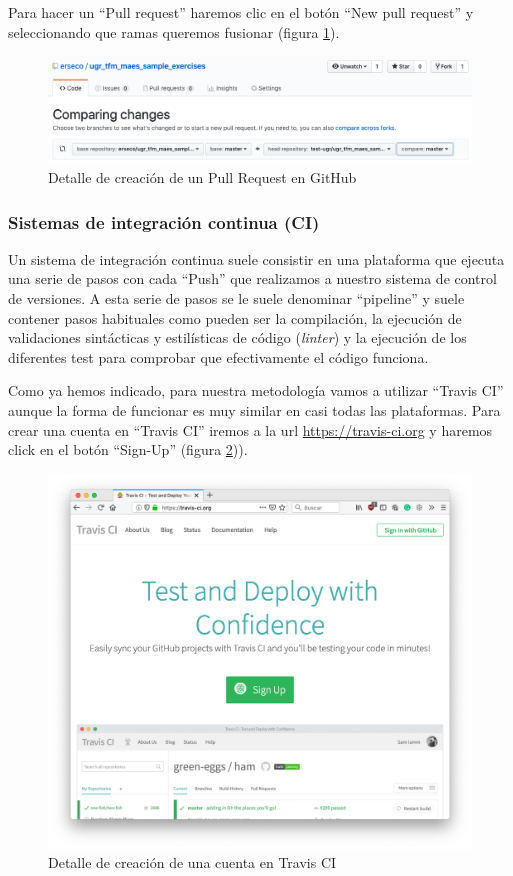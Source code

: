Para hacer un ``Pull request'' haremos clic en el botón ``New pull request'' y seleccionando que ramas queremos fusionar (figura \ref{fig:git_pr}).

\begin{figure}[H]
\centering
\includegraphics[width=1.0\textwidth]{../images/git_pr}
\caption{Detalle de creación de un Pull Request en GitHub}
\label{fig:git_pr}
\end{figure}


\subsubsection{Sistemas de integración continua (CI)}

Un sistema de integración continua suele consistir en una plataforma que ejecuta una serie de pasos con cada ``Push'' que realizamos a nuestro sistema de control de versiones. A esta serie de pasos se le suele denominar ``pipeline'' y suele contener pasos habituales como pueden ser la compilación, la ejecución de validaciones sintácticas y estilísticas de código (\textit{linter}) y la ejecución de los diferentes test para comprobar que efectivamente el código funciona.

\bigskip
Como ya hemos indicado, para nuestra metodología vamos a utilizar ``Travis CI'' aunque la forma de funcionar es muy similar en casi todas las plataformas. Para crear una cuenta en ``Travis CI'' iremos a la url \url{https://travis-ci.org} y haremos click en el botón ``Sign-Up'' (figura \ref{fig:travis_signup})).

\begin{figure}[H]
\centering
\includegraphics[width=1.0\textwidth]{../images/travis_signup}
\caption{Detalle de creación de una cuenta en Travis CI}
\label{fig:travis_signup}
\end{figure}

